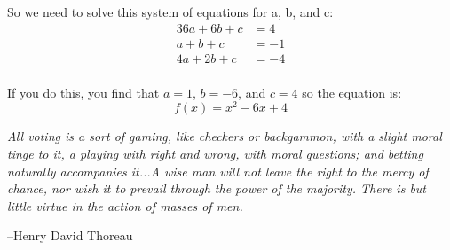 \documentclass[fleqn,addpoints]{exam}
\begin{document}
\begin{questions}
\begin{solution}[1cm]
So we need to solve this system of equations for a, b, and c:
\begin{align*}
  36a + 6b + c &= 4 \\
  a + b + c &= -1 \\
  4a + 2b + c &= -4 \\
\end{align*}

If you do this, you find that $a=1$, $b=-6$, and $c=4$ so the equation is:
\[
  f(x) = x^2 - 6x + 4
\]

\end{solution}

\end{questions}

\ifprintanswers


\fi

\ifprintanswers
\else
\vspace{0.25 cm}



{\em All voting is a sort of gaming, like checkers or backgammon, with a slight moral tinge to it, a playing with right
  and wrong, with moral questions; and betting naturally accompanies it...A wise man will not
  leave the right to the mercy of chance, nor wish it to prevail through the power of the majority. There is but little
  virtue in the action of masses of men.}

\vspace{.1 cm}
\hspace{1 cm} --Henry David Thoreau

\fi
\end{document}
